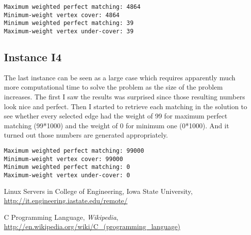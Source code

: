 \documentclass[11pt]{article}
\begin{document}
\begin{verbatim}
Maximum weighted perfect matching: 4864
Minimum-weight vertex cover: 4864
Minimum weighted perfect matching: 39
Maximum-weight vertex under-cover: 39
\end{verbatim}


\subsection{Instance I4}
The last instance can be seen as a large case which requires apparently much more computational time to solve the problem as the size of the problem increases. The first I saw the results was surprised since those resulting numbers look nice and perfect. Then I started to retrieve each matching in the solution to see whether every selected edge had the weight of 99 for maximum perfect matching (99*1000) and the weight of 0 for minimum one (0*1000). And it turned out those numbers are generated appropriately.%
\begin{verbatim}
Maximum weighted perfect matching: 99000
Minimum-weight vertex cover: 99000
Minimum weighted perfect matching: 0
Maximum-weight vertex under-cover: 0
\end{verbatim}


\begin{thebibliography}\frenchspacing
{

\small

 Linux Servers in College of Engineering, Iowa State University, \url{http://it.engineering.iastate.edu/remote/}

 C Programming Language, \textit{Wikipedia}, \url{http://en.wikipedia.org/wiki/C_(programming_language)}

}
\end{thebibliography}
\end{document}
